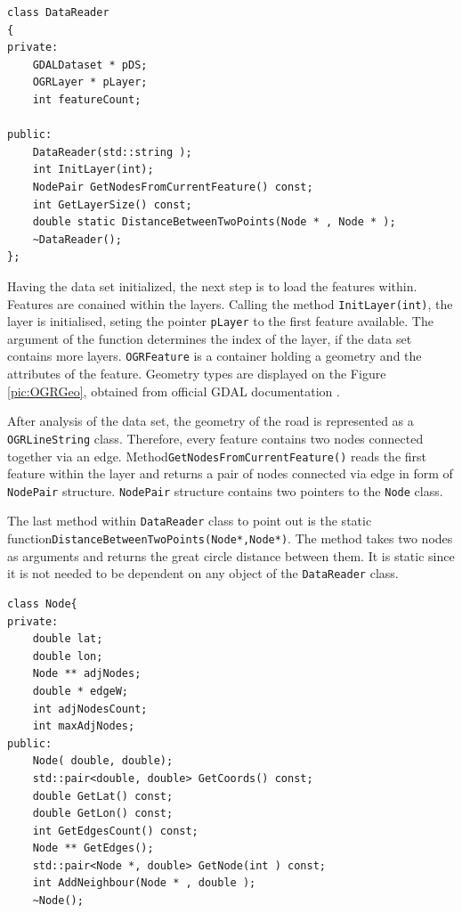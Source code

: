 \documentclass[thesis=M,english]{FITthesis}[2012/10/20]
\begin{document}
\begin{lstlisting}[frame=single, caption={\texttt{DataReader} class}, label={lst:DataReader}]
class DataReader
{
private:
    GDALDataset * pDS;
    OGRLayer * pLayer;
    int featureCount;

public:
    DataReader(std::string );
    int InitLayer(int);
    NodePair GetNodesFromCurrentFeature() const;
    int GetLayerSize() const;
    double static DistanceBetweenTwoPoints(Node * , Node * );
    ~DataReader();
};
\end{lstlisting}

Having the data set initialized, the next step is to load the features within. Features are conained within the layers. Calling the method \texttt{InitLayer(int)}, the layer is initialised, seting the pointer \texttt{pLayer} to the first feature available. The argument of the function determines the index of the layer, if the data set contains more layers. \texttt{OGRFeature} is a container holding a geometry and the attributes of the feature. Geometry types are displayed on the Figure \ref{pic:OGRGeo}, obtained from official GDAL documentation \cite{GDAL17}. 



After analysis of the data set, the geometry of the road is represented as a \texttt{OGRLineString} class. Therefore, every feature contains two nodes connected together via an edge. Method\texttt{GetNodesFromCurrentFeature()} reads the first feature within the layer and returns a pair of nodes connected via edge in form of \texttt{NodePair} structure. \texttt{NodePair} structure contains two pointers to the \texttt{Node} class. 

The last method within \texttt{DataReader} class to point out is the static function\texttt{DistanceBetweenTwoPoints(Node*,Node*)}. The method takes two nodes as arguments and returns the great circle distance between them. It is static since it is not needed to be dependent on any object of the \texttt{DataReader} class.

\begin{lstlisting}[frame=single, caption={\texttt{Node} class}, label={lst:Node}]
class Node{
private:
    double lat;
    double lon;
    Node ** adjNodes;
    double * edgeW;
    int adjNodesCount;
    int maxAdjNodes;
public:
    Node( double, double);
    std::pair<double, double> GetCoords() const;
    double GetLat() const;
    double GetLon() const;
    int GetEdgesCount() const;
    Node ** GetEdges();
    std::pair<Node *, double> GetNode(int ) const; 
	int AddNeighbour(Node * , double );
    ~Node();
\end{lstlisting}
\end{document}
